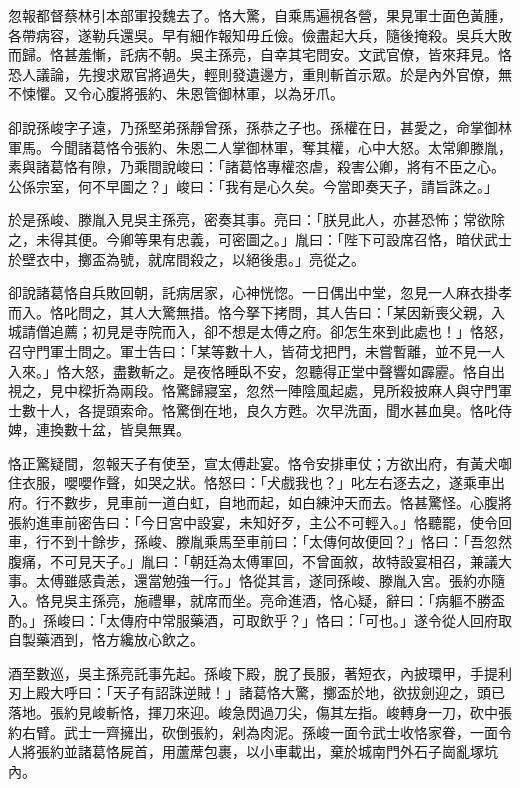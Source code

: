 忽報都督蔡林引本部軍投魏去了。恪大驚，自乘馬遍視各營，果見軍士面色黃腫，各帶病容，遂勒兵還吳。早有細作報知毋丘儉。儉盡起大兵，隨後掩殺。吳兵大敗而歸。恪甚羞慚，託病不朝。吳主孫亮，自幸其宅問安。文武官僚，皆來拜見。恪恐人議論，先搜求眾官將過失，輕則發遺邊方，重則斬首示眾。於是內外官僚，無不悚懼。又令心腹將張約、朱恩管御林軍，以為牙爪。

卻說孫峻字子遠，乃孫堅弟孫靜曾孫，孫恭之子也。孫權在日，甚愛之，命掌御林軍馬。今聞諸葛恪令張約、朱恩二人掌御林軍，奪其權，心中大怒。太常卿滕胤，素與諸葛恪有隙，乃乘間說峻曰：「諸葛恪專權恣虐，殺害公卿，將有不臣之心。公係宗室，何不早圖之？」峻曰：「我有是心久矣。今當即奏天子，請旨誅之。」

於是孫峻、滕胤入見吳主孫亮，密奏其事。亮曰：「朕見此人，亦甚恐怖；常欲除之，未得其便。今卿等果有忠義，可密圖之。」胤曰：「陛下可設席召恪，暗伏武士於壁衣中，擲盃為號，就席間殺之，以絕後患。」亮從之。

卻說諸葛恪自兵敗回朝，託病居家，心神恍惚。一日偶出中堂，忽見一人麻衣掛孝而入。恪叱問之，其人大驚無措。恪今拏下拷問，其人告曰：「某因新喪父親，入城請僧追薦；初見是寺院而入，卻不想是太傅之府。卻怎生來到此處也！」恪怒，召守門軍士問之。軍士告曰：「某等數十人，皆荷戈把門，未嘗暫離，並不見一人入來。」恪大怒，盡數斬之。是夜恪睡臥不安，忽聽得正堂中聲響如霹靂。恪自出視之，見中樑折為兩段。恪驚歸寢室，忽然一陣陰風起處，見所殺披麻人與守門軍士數十人，各提頭索命。恪驚倒在地，良久方甦。次早洗面，聞水甚血臭。恪叱侍婢，連換數十盆，皆臭無異。

恪正驚疑間，忽報天子有使至，宣太傅赴宴。恪令安排車仗；方欲出府，有黃犬啣住衣服，嚶嚶作聲，如哭之狀。恪怒曰：「犬戲我也？」叱左右逐去之，遂乘車出府。行不數步，見車前一道白虹，自地而起，如白練沖天而去。恪甚驚怪。心腹將張約進車前密告曰：「今日宮中設宴，未知好歹，主公不可輕入。」恪聽罷，使令回車，行不到十餘步，孫峻、滕胤乘馬至車前曰：「太傳何故便回？」恪曰：「吾忽然腹痛，不可見天子。」胤曰：「朝廷為太傅軍回，不曾面敘，故特設宴相召，兼議大事。太傅雖感貴恙，還當勉強一行。」恪從其言，遂同孫峻、滕胤入宮。張約亦隨入。恪見吳主孫亮，施禮畢，就席而坐。亮命進酒，恪心疑，辭曰：「病軀不勝盃酌。」孫峻曰：「太傳府中常服藥酒，可取飲乎？」恪曰：「可也。」遂令從人回府取自製藥酒到，恪方纔放心飲之。

酒至數巡，吳主孫亮託事先起。孫峻下殿，脫了長服，著短衣，內披環甲，手提利刃上殿大呼曰：「天子有詔誅逆賊！」諸葛恪大驚，擲盃於地，欲拔劍迎之，頭已落地。張約見峻斬恪，揮刀來迎。峻急閃過刀尖，傷其左指。峻轉身一刀，砍中張約右臂。武士一齊擁出，砍倒張約，剁為肉泥。孫峻一面令武士收恪家眷，一面令人將張約並諸葛恪屍首，用蘆蓆包裹，以小車載出，棄於城南門外石子崗亂塚坑內。

